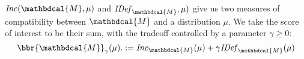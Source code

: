 \documentclass{article}
\theoremstyle{plain}
\theoremstyle{definition}
\theoremstyle{remark}
\newcommand{\thickD}{I\mkern-8muD}
\newcommand{\kldiv}{\thickD\infdivx}
\let\H\relax
\DeclareMathOperator{\H}{\mathrm{H}} %
\DeclareMathOperator*{\E}{\mathbb{E}} %
\newcommand\mat[1]{\mathbf{#1}}
\newcommand\numberthis{\addtocounter{equation}{1}\tag{\theequation}}
\def\sheq{\!=\!}
\newcommand{\bp}[1][L]{\mat{p}_{\!_{#1}\!}}
\newcommand{\Ed}{\mathcal E}
\newcommand{\dg}[1]{\mathbdcal{#1}}
\newcommand{\IDef}[1]{\mathit{IDef}_{#1}}
\newcommand\extrainfo[2][\dg M]{\IDef[#1](#2)}
\newcommand\Inc{\mathit{Inc}}
\numberwithin{equation}{section}
\begin{document}
$\Inc({\dg M}, \mu)$ and $\IDef{\dg M},\mu)$ give us two measures
of compatibility between ${\dg M}$ and a distribution $\mu$.
We take the score of interest to be their sum, with the tradeoff
        controlled by a parameter $\gamma \ge 0$:
        \begin{equation}
          	  \bbr{\dg M}_\gamma(\mu).
	 := \Inc_{\dg M}(\mu) + \gamma \IDef{\dg M}(\mu)
                \label{eqn:full-score}
    	\end{equation}
\end{document}
